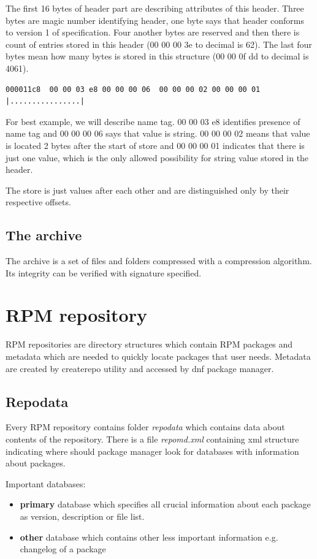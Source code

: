 The first 16 bytes of header part are describing attributes of this header. Three bytes are
magic number identifying header, one byte says that header conforms to version 1 of specification.
Four another bytes are reserved and then there is count of entries stored in this header
(00 00 00 3e to decimal is 62). The last four bytes mean how many bytes is stored in this structure
(00 00 0f dd to decimal is 4061).

\begin{lstlisting}
000011c8  00 00 03 e8 00 00 00 06  00 00 00 02 00 00 00 01  |................|
\end{lstlisting}

For best example, we will describe name tag. 00 00 03 e8 identifies presence of
name tag and 00 00 00 06 says that value is string. 00 00 00 02 means that value
is located 2 bytes after the start of store and 00 00 00 01 indicates that there is
just one value, which is the only allowed possibility for string value stored in the header.

The store is just values after each other and are distinguished only by their respective offsets.

\subsection*{The archive}
The archive is a set of files and folders compressed with a compression algorithm. Its integrity
can be verified with signature specified.

\section{RPM repository}
RPM repositories are directory structures which contain RPM packages and metadata which are needed
to quickly locate packages that user needs. Metadata are created by createrepo \cite{RPMRepository}
utility and accessed by dnf package manager. 

\subsection*{Repodata}
Every RPM repository contains folder \textit{repodata} which contains data about contents of the
repository. There is a file \textit{repomd.xml} containing xml structure indicating where should
package manager look for databases with information about packages.

Important databases:
\begin{itemize}
  \item \textbf{primary} database which specifies all crucial information about each package as version, description or file list.
  \item \textbf{other} database which contains other less important information e.g. changelog of a package
\end{itemize}

